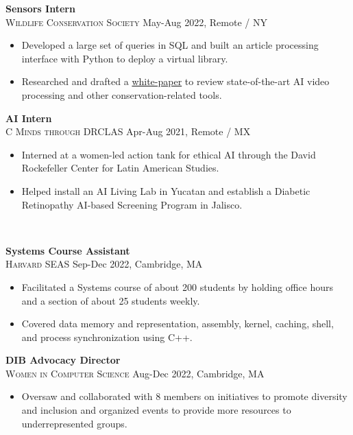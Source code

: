 \documentclass[11pt]{article}
\begin{document}
    \noindent \textbf{Sensors Intern}\\
    \textsc{{Wildlife Conservation Society}} \hfill May-Aug 2022, Remote / NY
    \begin{itemize}[itemsep=-.4em, leftmargin=1em]\vspace{-2mm}
      \item Developed a large set of queries in SQL and built an article processing interface with Python to deploy a virtual library.
      \item Researched and drafted a 
      \href{https://bit.ly/AI-Advancing-Video-Processing-and-CTDS}{white-paper} to review state-of-the-art AI video processing and other conservation-related tools.
    \end{itemize}

    \noindent \textbf{AI Intern}\\
    \textsc{{C Minds through DRCLAS}} \hfill Apr-Aug 2021, Remote / MX
    \begin{itemize}[itemsep=-.4em, leftmargin=1em]\vspace{-2mm}
      \item Interned at a women-led action tank for ethical AI through the David Rockefeller Center for Latin American Studies.
      \item Helped install an AI Living Lab in Yucatan and establish a Diabetic Retinopathy AI-based Screening Program in Jalisco.
    \end{itemize}

  \vspace{-7pt}\\
  \noindent\makebox[\linewidth]{\rule{7.5in}{0.3pt}}


  \noindent\textbf{Systems Course Assistant}  \\
  \textsc{Harvard SEAS} \hfill Sep-Dec 2022, Cambridge, MA
  \begin{itemize}[itemsep=-.4em, leftmargin=1em]\vspace{-2mm}
    \item Facilitated a Systems course of about 200 students by holding office hours and a section of about 25 students weekly.
    \item Covered data memory and representation, assembly, kernel, caching, shell, and process synchronization using C++.
  \end{itemize}

  \noindent\textbf{DIB Advocacy Director} \\
  \textsc{Women in Computer Science} \hfill Aug-Dec 2022, Cambridge, MA
  \begin{itemize}[itemsep=-.4em, leftmargin=1em]\vspace{-2mm}
    \item Oversaw and collaborated with 8 members on initiatives to promote diversity and inclusion and organized events to provide more resources to underrepresented groups.
  \end{itemize}
\end{document}
